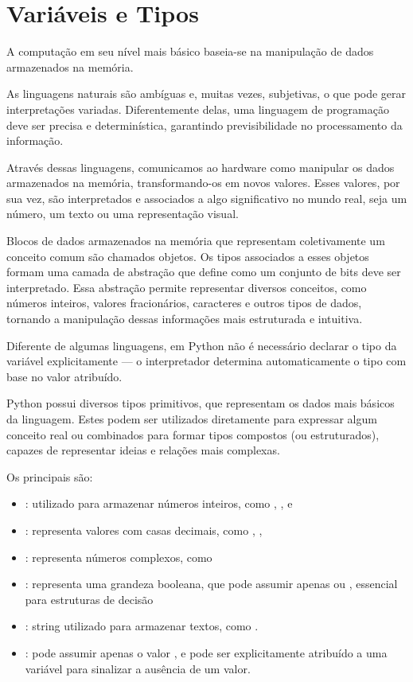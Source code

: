 \chapter{Variáveis e Tipos}

A computação em seu nível mais básico baseia-se na manipulação de dados armazenados na memória.

As linguagens naturais são ambíguas e, muitas vezes, subjetivas, o que pode gerar interpretações variadas.
Diferentemente delas, uma linguagem de programação deve ser precisa e determinística, garantindo previsibilidade no
processamento da informação.

Através dessas linguagens, comunicamos ao hardware como manipular os dados armazenados na memória, transformando-os
em novos valores.
Esses valores, por sua vez, são interpretados e associados a algo significativo no mundo real, seja um número, um
texto ou uma representação visual.

Blocos de dados armazenados na memória que representam coletivamente um conceito comum são chamados objetos.
Os tipos associados a esses objetos formam uma camada de abstração que define como um conjunto de bits deve ser
interpretado.
Essa abstração permite representar diversos conceitos, como números inteiros, valores fracionários, caracteres e outros
tipos de dados, tornando a manipulação dessas informações mais estruturada e intuitiva.

Diferente de algumas linguagens, em Python não é necessário declarar o tipo da variável explicitamente
--- o interpretador determina automaticamente o tipo com base no valor atribuído.

Python possui diversos tipos primitivos, que representam os dados mais básicos da linguagem.
Estes podem ser utilizados diretamente para expressar algum conceito real ou combinados para formar tipos compostos
(ou estruturados), capazes de representar ideias e relações mais complexas.


Os principais são:

\begin{itemize}
    \item {}: utilizado para armazenar números inteiros, como , , e 
    \item {}: representa valores com casas decimais, como , , 
    \item {}: representa números complexos, como 
    \item {}: representa uma grandeza booleana, que pode assumir apenas  ou , essencial para estruturas de decisão
    \item {}: string utilizado para armazenar textos, como .
    \item {}: pode assumir apenas o valor , e pode ser explicitamente atribuído
    a uma variável para sinalizar a ausência de um valor.



\end{itemize}

